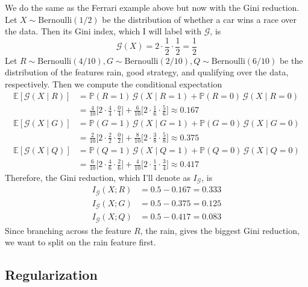 \documentclass{article}
\begin{document}
  \begin{example}
    We do the same as the Ferrari example above but now with the Gini reduction. Let $X \sim \mathrm{Bernoulli}(1/2)$ be the distribution of whether a car wins a race over the data. Then its Gini index, which I will label with $\mathcal{G}$, is \[\mathcal{G} (X) = 2 \cdot \frac{1}{2} \cdot \frac{1}{2} = \frac{1}{2}\]
    Let $R \sim \mathrm{Bernoulli}(4/10), G \sim \mathrm{Bernoulli}(2/10), Q \sim \mathrm{Bernoulli}(6/10)$ be the distribution of the features rain, good strategy, and qualifying over the data, respectively. Then we compute the conditional expectation 
    \begin{align*}
        \mathbb{E}[\mathcal{G}(X \mid R)] & = \mathbb{P}(R = 1)\, \mathcal{G}(X \mid R = 1) + \mathbb{P}(R = 0) \, \mathcal{G}(X \mid R = 0) \\ 
        & = \frac{4}{10} \bigg[ 2 \cdot \frac{4}{4} \cdot \frac{0}{4} \bigg] + \frac{6}{10} \bigg[ 2 \cdot \frac{1}{6} \cdot \frac{5}{6} \bigg] \approx 0.167 \\
        \mathbb{E}[\mathcal{G}(X \mid G)] & = \mathbb{P}(G = 1)\, \mathcal{G}(X \mid G = 1) + \mathbb{P}(G = 0) \, \mathcal{G}(X \mid G = 0) \\ 
        & = \frac{2}{10} \bigg[ 2 \cdot \frac{2}{2} \cdot \frac{0}{2} \bigg] + \frac{8}{10} \bigg[ 2 \cdot \frac{3}{8} \cdot \frac{5}{8} \bigg] \approx 0.375 \\
        \mathbb{E}[\mathcal{G}(X \mid Q)] & = \mathbb{P}(Q = 1)\, \mathcal{G}(X \mid Q = 1) + \mathbb{P}(Q = 0) \, \mathcal{G}(X \mid Q = 0) \\ 
        & = \frac{6}{10} \bigg[ 2 \cdot \frac{4}{6} \cdot \frac{2}{6} \bigg] + \frac{4}{10} \bigg[ 2 \cdot \frac{1}{4} \cdot \frac{3}{4} \bigg] \approx 0.417
    \end{align*}
    Therefore, the Gini reduction, which I'll denote as $I_{\mathcal{G}}$, is 
    \begin{align*}
        I_{\mathcal{G}} (X ; R) & = 0.5 - 0.167 = 0.333 \\
        I_{\mathcal{G}} (X ; G) & = 0.5 - 0.375 = 0.125 \\
        I_{\mathcal{G}} (X ; Q) & = 0.5 - 0.417 = 0.083
    \end{align*}
    Since branching across the feature $R$, the rain, gives the biggest Gini reduction, we want to split on the rain feature first. 
  \end{example}

  \subsection{Regularization}
\end{document}
